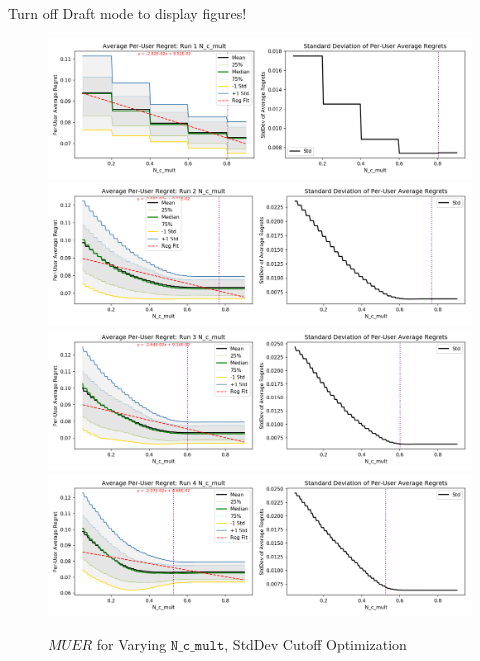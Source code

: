 	\fi





	\ifdraft
	Turn off Draft mode to display figures!
	\else

	\begin{figure}[H]
	\includegraphics[width=1.1\textwidth,center]{figures/opt_param/opt_param_std_11100_N_c_mult1.png}%
	\newline
	\includegraphics[width=1.1\textwidth,center]{figures/opt_param/opt_param_std_11100_N_c_mult2.png}%
	\newline
	\includegraphics[width=1.1\textwidth,center]{figures/opt_param/opt_param_std_11100_N_c_mult3.png}%
	\newline
	\includegraphics[width=1.1\textwidth,center]{figures/opt_param/opt_param_std_11100_N_c_mult4.png}%
	\caption{$MUER$ for Varying $\mathtt{N\_c\_mult}$, StdDev Cutoff Optimization}
	\end{figure}

